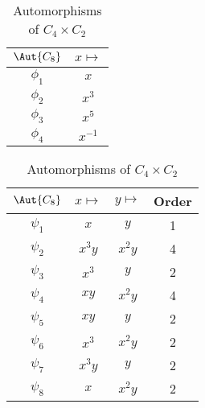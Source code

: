 
\begin{table}[ht]
    \begin{minipage}{0.5\linewidth}
        \caption{Automorphisms of \(C_8\)}\label{tab:aut_C8}
        \centering
        \begin{tabular}{c|c}
            \(\Aut{C_8}\) & \(x \mapsto\) \\
            \midrule
            \(\phi_1\) & \(x\) \\
            \(\phi_2\) & \(x^3\) \\
            \(\phi_3\) & \(x^5\) \\
            \(\phi_4\) & \(x^{-1}\)
        \end{tabular}
    \end{minipage}
    \begin{minipage}{0.5\linewidth}
        \caption{Automorphisms of \(C_4 \times C_2\)}\label{tab:aut_C4xC2}
        \centering
        \begin{tabular}{c|c|c|c}
            \(\Aut{C_8}\) & \(x \mapsto\) & \(y \mapsto\) & Order \\
            \midrule
            \(\psi_1\) & \(x\) & \(y\) & 1\\
            \(\psi_2\) & \(x^3 y\) & \(x^2 y\) & 4 \\
            \(\psi_3\) & \(x^3\) & \(y\) & 2 \\
            \(\psi_4\) & \(xy\) & \(x^2 y\) & 4 \\
            \(\psi_5\) & \(xy\) & \(y\) & 2 \\
            \(\psi_6\) & \(x^3\) & \(x^2 y\) & 2\\
            \(\psi_7\) & \(x^3 y\) & \(y\) & 2 \\
            \(\psi_8\) & \(x\) & \(x^2 y\) & 2 \\
        \end{tabular}
    \end{minipage}
\end{table}

